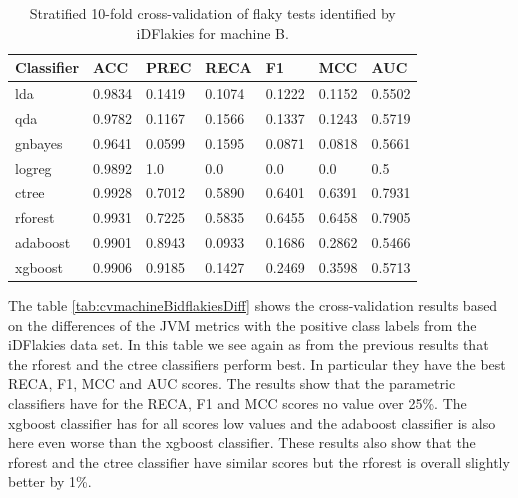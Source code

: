 \documentclass{seal_thesis}
\begin{document}
\begin{table}[ht]
\centering
\begin{tabular}{|l|l|l|l|l|l|l|}
\hline
\textbf{Classifier} & \textbf{ACC} & \textbf{PREC} & \textbf{RECA} & \textbf{F1} & \textbf{MCC} & \textbf{AUC} \\ \hline
  lda & 0.9834 & 0.1419 & 0.1074 & 0.1222 & 0.1152 & 0.5502 \\ \hline
  qda & 0.9782 & 0.1167 & 0.1566 & 0.1337 & 0.1243 & 0.5719 \\ \hline
  gnbayes & 0.9641 & 0.0599 & 0.1595 & 0.0871 & 0.0818 & 0.5661 \\ \hline
  logreg & 0.9892 & 1.0 & 0.0 & 0.0 & 0.0 & 0.5 \\ \hline
  ctree & 0.9928 & 0.7012 & 0.5890 & 0.6401 & 0.6391 & 0.7931 \\ \hline
  rforest & 0.9931 & 0.7225 & 0.5835 & 0.6455 & 0.6458 & 0.7905 \\ \hline
  adaboost & 0.9901 & 0.8943 & 0.0933 & 0.1686 & 0.2862 & 0.5466 \\ \hline
  xgboost & 0.9906 & 0.9185 & 0.1427 & 0.2469 & 0.3598 & 0.5713 \\ \hline
\end{tabular}
\caption{Stratified 10-fold cross-validation of flaky tests identified by iDFlakies for machine B.}
\label{tab:cvmachineBidflakies}
\end{table}



\noindent The table \ref{tab:cvmachineBidflakiesDiff} shows the cross-validation results based on the differences of the JVM metrics with the positive class labels from the iDFlakies data set. In this table we see again as from the previous results that the rforest and the ctree classifiers perform best. In particular they have the best RECA, F1, MCC and AUC scores. The results show that the parametric classifiers have for the RECA, F1 and MCC scores no value over 25\%. The xgboost classifier has for all scores low values and the adaboost classifier is also here even worse than the xgboost classifier. These results also show that the rforest and the ctree classifier have similar scores but the rforest is overall slightly better by 1\%. \\
\end{document}
